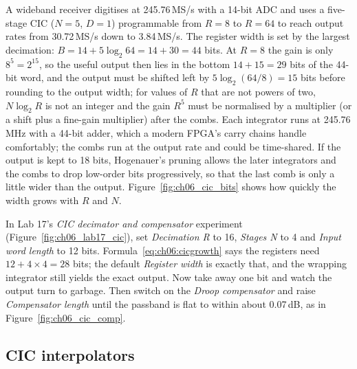 \begin{worked}
A wideband receiver digitises at 245.76\,MS/s with a 14-bit ADC and uses a five-stage CIC ($N=5$,
$D=1$) programmable from $R=8$ to $R=64$ to reach output rates from 30.72\,MS/s down to 3.84\,MS/s.
The register width is set by the largest decimation: $B=14+5\log_2 64=14+30=44$ bits. At $R=8$ the
gain is only $8^5=2^{15}$, so the useful output then lies in the bottom $14+15=29$ bits of the
44-bit word, and the output must be shifted left by $5\log_2(64/8)=15$ bits before rounding to the
output width; for values of $R$ that are not powers of two, $N\log_2R$ is not an integer and the
gain $R^5$ must be normalised by a multiplier (or a shift plus a fine-gain multiplier) after the
combs. Each integrator runs at 245.76\,MHz with a 44-bit adder, which a modern FPGA's carry chains
handle comfortably; the combs run at the output rate and could be time-shared. If the output is
kept to 18 bits, Hogenauer's pruning allows the later integrators and the combs to drop low-order
bits progressively, so that the last comb is only a little wider than the output.
Figure~\ref{fig:ch06_cic_bits} shows how quickly the width grows with $R$ and $N$.
\end{worked}


\begin{tryit}
In Lab 17's \emph{CIC decimator and compensator} experiment (Figure~\ref{fig:ch06_lab17_cic}), set \emph{Decimation R} to 16,
\emph{Stages N} to 4 and \emph{Input word length} to 12 bits. Formula~\eqref{eq:ch06:cicgrowth}
says the registers need $12+4\times4=28$ bits; the default \emph{Register width} is exactly that,
and the wrapping integrator still yields the exact output. Now take away one bit and watch the
output turn to garbage. Then switch on the \emph{Droop compensator} and raise
\emph{Compensator length} until the passband is flat to within about 0.07\,dB, as in
Figure~\ref{fig:ch06_cic_comp}.
\end{tryit}

\subsection{CIC interpolators}

